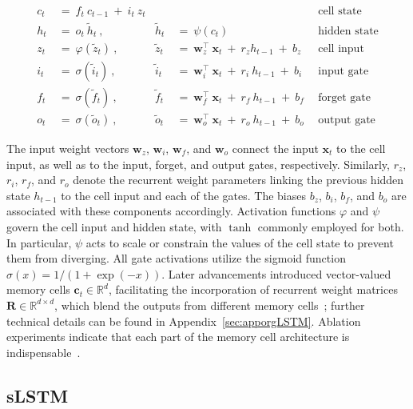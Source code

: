 \begin{align}
c_t \ &= \  f_t \ c_{t-1} \ + \ i_t \ z_t &  & &\text{cell state} \\
h_t  \ &= \ o_t \ \tilde{h}_t \ , & \tilde{h}_t \ &= \ \psi \left( c_t\right)
  &\text{hidden state} \\
z_t \ &= \ \varphi \left( \tilde{z}_t \right) \ , 
  &\tilde{z}_t \ &=  \ \mathbf{w}^\top_{z} \ \mathbf{x}_t \ + \
  r_{z}  h_{t-1} \ + \  b_{z} \ \
  &\text{cell input} \\
i_t \ &= \ \sigma \left( \tilde{i}_t  \right) \ , 
  &\tilde{i}_t \ &= \ \mathbf{w}^\top_{i} \ \mathbf{x}_t \ + \
  r_{i}  \ h_{t-1} \ + \  b_{i} \ \
  &\text{input gate} \\
f_t \ &= \ \sigma \left(  \tilde{f}_t \right) \ , 
  &\tilde{f}_t \ &= \ \mathbf{w}^\top_{f} \ \mathbf{x}_t  \ + \
  r_{f}  \ h_{t-1} \ + \  b_{f} \ \
  &\text{forget gate} \\
o_t \ &= \ \sigma \left( \tilde{o}_t \right) \ , 
  &\tilde{o}_t  \ &= \ \mathbf{w}^\top_{o} \ \mathbf{x}_t \ + \
  r_{o}  \ h_{t-1} \ + \  b_{o} \ \
  &\text{output gate} 
\end{align}

The input weight vectors $\mathbf{w}_{z}$, $\mathbf{w}_{i}$, $\mathbf{w}_{f}$, and $\mathbf{w}_{o}$ connect the input $\mathbf{x}_t$ to the cell input, as well as to the input, forget, and output gates, respectively. Similarly, $r_{z}$, $r_{i}$, $r_{f}$, and $r_{o}$ denote the recurrent weight parameters linking the previous hidden state $h_{t-1}$ to the cell input and each of the gates. The biases $b_{z}$, $b_{i}$, $b_{f}$, and $b_{o}$ are associated with these components accordingly. Activation functions $\varphi$ and $\psi$ govern the cell input and hidden state, with $\tanh$ commonly employed for both. In particular, $\psi$ acts to scale or constrain the values of the cell state to prevent them from diverging. All gate activations utilize the sigmoid function $\sigma \left( x \right)= 1/(1+\exp(-x))$. Later advancements introduced vector-valued memory cells $\mathbf{c}_t \in \mathbb{R}^{d}$, facilitating the incorporation of recurrent weight matrices $\mathbf{R} \in \mathbb{R}^{d \times d}$, which blend the outputs from different memory cells~\citep{Greff:15}; further technical details can be found in Appendix~\ref{sec:apporgLSTM}. Ablation experiments indicate that each part of the memory cell architecture is indispensable~\citep{Greff:15}.

\subsection{sLSTM}
\label{sec:sLSTM}

